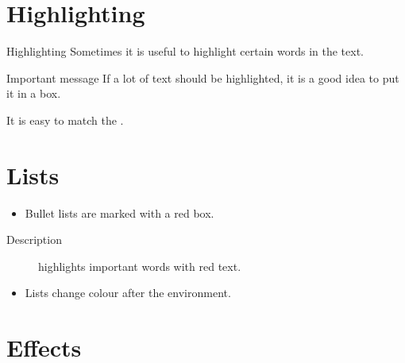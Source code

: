 \documentclass[aspectratio=169]{beamer}
\begin{document}
\section{Highlighting}


\begin{frame}{Highlighting}
    Sometimes it is useful to \alert{highlight} certain words in the text.

    \begin{alertblock}{Important message}
        If a lot of text should be \alert{highlighted}, it is a good idea to put it in a box.
    \end{alertblock}

    It is easy to match the .
\end{frame}


\section{Lists}


\begin{frame}
    \begin{itemize}
        \item
        Bullet lists are marked with a red box.
    \end{itemize}


    \begin{description}
        \item[Description] highlights important words with red text.
    \end{description}


    \begin{example}
        \begin{itemize}
            \item
            Lists change colour after the environment.
        \end{itemize}
    \end{example}
\end{frame}


\section{Effects}
\end{document}
